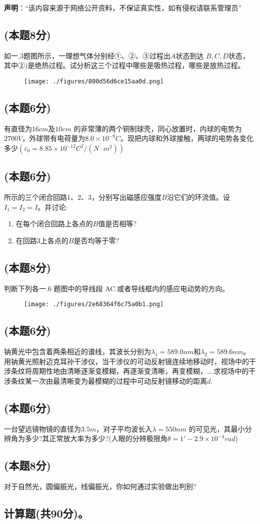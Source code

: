 
\textbf{声明}：“该内容来源于网络公开资料，不保证真实性，如有侵权请联系管理员”

\subsection{(本题8分)}
如一,3题图所示，一理想气体分别经①、②、③过程出$A$状态到达 $B,C,D$状态，其中②)是绝热过程。试分析这三个过程中哪些是吸热过程，哪些是放热过程。
\begin{figure}[ht]
\centering
\texttt{[image: ./figures/800d56d6ce15aa0d.png]}
\caption{} \label{fig_CD13_1}
\end{figure}
\subsection{(本题6分)}
有直径为$16cm$及$10cm$ 的非常薄的两个铜制球壳，同心放置时，内球的电势为 $2700V$，外球带有电荷量为$8.0\times10^{-9}C$。现把内球和外球接触，两球的电势各变化多少$(\varepsilon_0=8.85\times10^{-12} C^2/(N\cdot m^2))$
\subsection{(本题6分)}
所示的三个闭合回路1、2、3，分别写出磁感应强度$B$沿它们的环流值。设$I_1=I_2=I$。并讨论:
\begin{enumerate}
\item 在每个闭合回路上各点的$B$值是否相等?
\item 在回路3上各点的$B$是否均等于零?
\end{enumerate}
\subsection{(本题8分)}
判断下列各一.6 题图中的导线段 AC.或者导线框内的感应电动势的方向。
\begin{figure}[ht]
\centering
\texttt{[image: ./figures/2e68364f6c75a0b1.png]}
\caption{} \label{fig_CD13_2}
\end{figure}
\subsection{(本题6分)}
钠黄光中包含着两条相近的谱线，其波长分别为$\lambda_1=589.0nm$和$\lambda_2=589.6nm$。用钠黄光照射迈克耳孙干涉仪，当干涉仪的可动反射镜连续地移动时，视场中的干涉条纹将周期性地由清晰逐渐变模糊，再逐渐变清晰，再变模糊，….求视场中的干涉条纹某一次由最清晰变为最模糊的过程中可动反射镜移动的距离$d$.
\subsection{(本题6分)}
一台望远镜物镜的直径为$3.5m$，对子平均波长入$\lambda=550nm$ 的可见光，其最小分辨角为多少?其正常放大率为多少?(人眼的分辨极限角$\theta=1'-2.9\times10^{-4}rad$)
\subsection{(本题8分)}
对于自然光，圆偏振光，线偏振光，你如何通过实验做出判别?
\subsection{计算题(共90分)。}